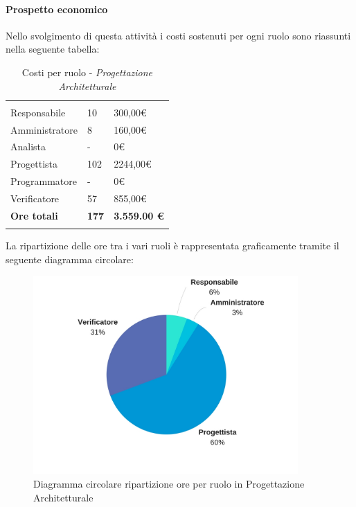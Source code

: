 			\paragraph{Prospetto economico} \Spazio
			Nello svolgimento di questa attività i costi sostenuti per ogni ruolo sono riassunti nella seguente tabella:
			\begin{table}[H]
			\centering
			\begin{tabular}{|p{4cm}|C{4cm}|C{4cm}|}
				
				 & &\\
				Responsabile & 10 & 300,00\euro \\
				\hline
				Amministratore& 8 & 160,00\euro \\
				\hline
				Analista & - & 0\euro \\
				\hline
				Progettista & 102 & 2244,00\euro \\
				\hline
				Programmatore & - & 0\euro \\
				\hline
				Verificatore & 57 & 855,00\euro \\
				\hline
				\textbf{Ore totali} & \textbf{177} & \textbf{3.559.00 \euro} \\
			\end{tabular}
			\caption{Costi per ruolo - \textit{Progettazione Architetturale}}
		\end{table}
		
		La ripartizione delle ore tra i vari ruoli è rappresentata graficamente tramite il seguente diagramma circolare:
		
		\begin{figure}[h] 
			\centering 
			\includegraphics[width=0.9\textwidth]{images/CircolareProgettazioneArchitetturale.jpg} 
			\caption{Diagramma circolare ripartizione ore per ruolo in Progettazione Architetturale}
			\label{CircolareProgettazioneArchitetturale}
		\end{figure}		

